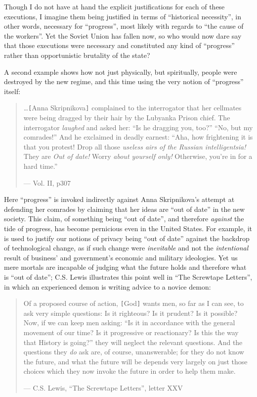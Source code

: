 \documentclass{article}
\begin{document}
Though I do not have at hand the explicit justifications for each of these executions, I imagine them being justified in terms of ``historical necessity'', in other words, necessary for ``progress'', most likely with regards to ``the cause of the workers''.  Yet the Soviet Union has fallen now, so who would now dare say that those executions were necessary and constituted any kind of ``progress'' rather than opportunistic brutality of the state?

A second example shows how not just physically, but spiritually, people were destroyed by the new regime, and this time using the very notion of ``progress'' itself:

\begin{quote}
\ldots \verb|[|Anna Skripnikova\verb|]| complained to the interrogator that her cellmates were being dragged by their hair by the Lubyanka Prison chief.  The interrogator \emph{laughed} and asked her: ``Is he dragging you, too?'' ``No, but my comrades!''  And he exclaimed in deadly earnest: ``Aha, how frightening it is that you protest!  Drop all those \emph{useless airs of the Russian intelligentsia!}  They are \emph{Out of date!}  Worry \emph{about yourself only!}  Otherwise, you're in for a hard time.''

--- Vol. II, p307
\end{quote}

Here ``progress'' is invoked indirectly against Anna Skripnikova's attempt at defending her comrades by claiming that her ideas are ``out of date'' in the new society. This claim, of something being ``out of date'', and therefore \emph{against} the tide of progress, has become pernicious even in the United States.  For example, it is used to justify our notions of privacy being ``out of date'' against the backdrop of technological change, as if such change were \emph{inevitable} and not the \emph{intentional} result of business' and government's economic and military ideologies.  Yet us mere mortals are incapable of judging what the future holds and therefore what is ``out of date''; C.S. Lewis illustrates this point well in ``The Screwtape Letters'', in which an experienced demon is writing advice to a novice demon:

\begin{quote}
Of a proposed course of action, \verb|[|God\verb|]| wants men, so far as I can see, to ask very simple questions: Is it righteous?  Is it prudent?  Is it possible?  Now, if we can keep men asking: ``Is it in accordance with the general movement of our time?  Is it progressive or reactionary?  Is this the way that History is going?'' they will neglect the relevant questions.  And the questions they \emph{do} ask are, of course, unanswerable; for they do not know the future, and what the future will be depends very largely on just those choices which they now invoke the future in order to help them make.

--- C.S. Lewis, ``The Screwtape Letters'', letter XXV
\end{quote}
\end{document}

